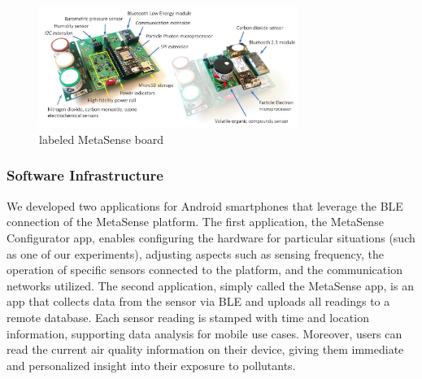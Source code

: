 \documentclass[journal abbreviation, manuscript]{copernicus}
\begin{document}


\begin{figure}[H]
\centering
\includegraphics[width=0.75\textwidth]{writeup/img/metasense-platform}
\caption{labeled MetaSense board}
\label{fig:img-label}
\end{figure}

\subsubsection{Software Infrastructure}


We developed two applications for Android smartphones that leverage the BLE connection of the MetaSense platform. The first application, the MetaSense Configurator app, enables configuring the hardware for particular situations (such as one of our experiments), adjusting aspects such as sensing frequency, the operation of specific sensors connected to the platform, and the communication networks utilized.  The second application, simply called the MetaSense app, is an app that collects data from the sensor via BLE and uploads all readings to a remote database.  Each sensor reading is stamped with time and location information, supporting data analysis for mobile use cases. Moreover, users can read the current air quality information on their device, giving them immediate and personalized insight into their exposure to pollutants.
\end{document}
